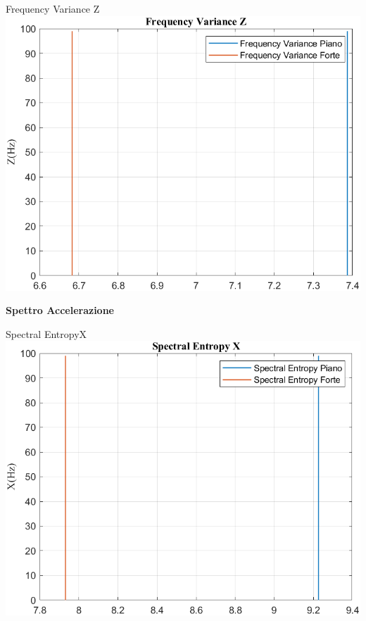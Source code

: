 	\begin{frame}{{Frequency Variance Z}}
		\centering\includegraphics[height=.8\textheight]{figure/Acc/Trasformata/Frequency VarianceZ}
	\end{frame}
	
	\begin{frame}
		\color{blue}\centering\huge{\textbf{Spettro Accelerazione}}
	\end{frame}
	
	\begin{frame}{{Spectral EntropyX}}
		\centering\includegraphics[height=.8\textheight]{figure/Acc/Trasformata/Spectral EntropyX}
	\end{frame}
	
